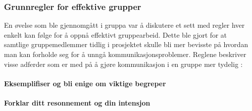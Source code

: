\subsubsection{Grunnregler for effektive grupper}

En øvelse som ble gjennomgått i gruppa var å diskutere et sett med regler hver enkelt kan følge for å oppnå effektivt gruppearbeid.
Dette ble gjort for at samtlige gruppemedlemmer tidlig i prosjektet skulle bli mer bevisste på hvordan man kan forholde seg for å unngå kommunikasjonsproblemer.
Reglene beskriver visse adferder som er med på å gjøre kommunikasjon i en gruppe mer tydelig \cite{schwarz}:




\paragraph{Eksemplifiser og bli enige om viktige begreper}


\paragraph{Forklar ditt resonnement og din intensjon}\label{forklardittres}


